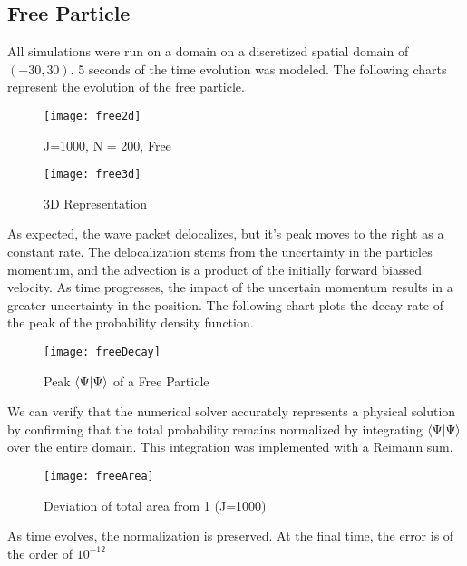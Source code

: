 \documentclass[twoside,twocolumn]{article}
\begin{document}
\subsection{Free Particle}
All simulations were run on a domain on a discretized spatial domain of $(-30,30)$. 5 seconds of the time evolution was modeled. The following charts represent the evolution of the free particle.
\begin{figure}[H]
\centering
\texttt{[image: free2d]}
\caption{J=1000, N = 200, Free}
\label{free2d}
\end{figure}
\begin{figure}[htp]
\centering
\texttt{[image: free3d]}
\caption{3D Representation}
\label{}
\end{figure}
As expected, the wave packet delocalizes, but it's peak moves to the right as a constant rate. The delocalization stems from the uncertainty in the particles momentum, and the advection is a product of the initially forward biassed velocity. As time progresses, the impact of the uncertain momentum results in a greater uncertainty in the position. The following chart plots the decay rate of the peak of the probability density function.
\begin{figure}[htp]
\centering
\texttt{[image: freeDecay]}
\caption{Peak $\bra{\Psi}\ket{\Psi}$ of a Free Particle}
\label{}
\end{figure}
We can verify that the numerical solver accurately represents a physical solution by confirming that the total probability remains normalized by integrating $\bra{\Psi}\ket{\Psi}$ over the entire domain. This integration was implemented with a Reimann sum.
\begin{figure}[htp]
\centering
\texttt{[image: freeArea]}
\caption{Deviation of total area from 1 (J=1000)}
\label{}
\end{figure}
As time evolves, the normalization is preserved. At the final time, the error is of the order of $10^{-12}$
\end{document}
